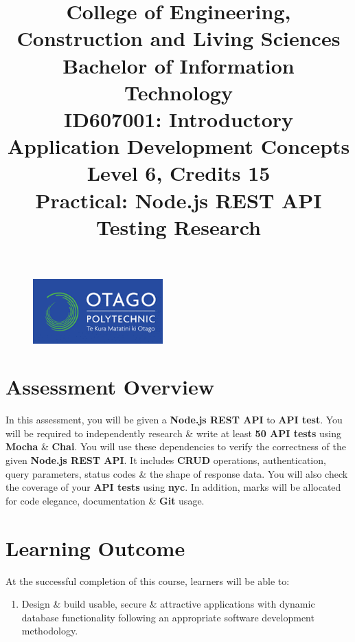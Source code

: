 \documentclass{article}
\author{}
\begin{document}
\begin{figure}
    \centering
    \includegraphics[width=50mm]{../img/logo.png}
\end{figure}

\title{College of Engineering, Construction and Living Sciences\\Bachelor of Information Technology\\ID607001: Introductory Application Development Concepts\\Level 6, Credits 15\\\textbf{Practical: Node.js REST API Testing Research}}
\date{}
\maketitle

\section*{Assessment Overview}
In this assessment, you will be given a \textbf{Node.js REST API} to \textbf{API test}. You will be required to independently research \& write at least \textbf{50 API tests} using \textbf{Mocha} \& \textbf{Chai}. You will use these dependencies to verify the correctness of the given \textbf{Node.js REST API}. It includes \textbf{CRUD} operations, authentication, query parameters, status codes \& the shape of response data. You will also check the coverage of your \textbf{API tests} using \textbf{nyc}. In addition, marks will be allocated for code elegance, documentation \& \textbf{Git} usage. 

\section*{Learning Outcome}
At the successful completion of this course, learners will be able to:
\begin{enumerate}
    \item Design \& build usable, secure \& attractive applications with dynamic database functionality following an appropriate software development methodology.
\end{enumerate}
\end{document}
